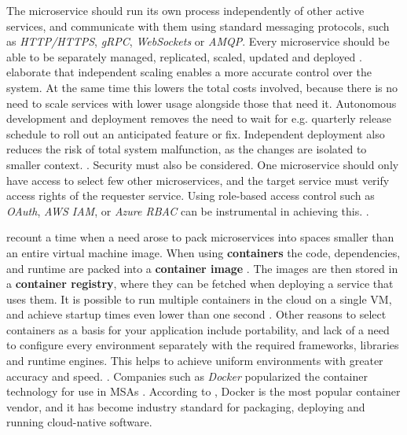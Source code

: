 \documentclass[utf8,english]{gradu3}
\begin{document}
The microservice should run its own process independently of other active
services, and communicate with them using standard messaging protocols, such as
\textit{HTTP/HTTPS}, \textit{gRPC}, \textit{WebSockets} or \textit{AMQP}. Every
microservice should be able to be separately managed, replicated, scaled,
updated and deployed \parencite[18]{Gannon2017}. \textcite{Microsoft2022}
elaborate that independent scaling enables a more accurate control over the
system. At the same time this lowers the total costs involved, because there is no
need to scale services with lower usage alongside those that need it. Autonomous
development and deployment removes the need to wait for e.g. quarterly release
schedule to roll out an anticipated feature or fix. Independent deployment also
reduces the risk of total system malfunction, as the changes are isolated to
smaller context. \parencite{Microsoft2022}. Security must also be considered.
One microservice should only have access to select few other microservices, and
the target service must verify access rights of the requester service. Using
role-based access control such as \textit{OAuth}, \textit{AWS IAM}, or
\textit{Azure RBAC} can be instrumental in achieving this.
\parencite[18]{Gannon2017}.

\textcite[18]{Gannon2017} recount a time when a need arose to pack microservices
into spaces smaller than an entire virtual machine image. When using
\textbf{containers} the code, dependencies, and runtime are packed into a
\textbf{container image} \parencite{Microsoft2022}. The images are then stored
in a \textbf{container registry}, where they can be fetched when deploying a
service that uses them. It is possible to run multiple containers in the cloud
on a single VM, and achieve startup times even lower than one second
\parencite[18]{Gannon2017}. Other reasons to select containers as a basis for
your application include portability, and lack of a need to configure every environment
separately with the required frameworks, libraries and runtime engines. This
helps to achieve uniform environments with greater accuracy and speed.
\parencite{Microsoft2022}. Companies such as \textit{Docker} popularized the
container technology for use in MSAs \parencite[18]{Gannon2017}. According to
\textcite{Microsoft2022}, Docker is the most popular container vendor, and it
has become industry standard for packaging, deploying and running cloud-native
software.
\end{document}
